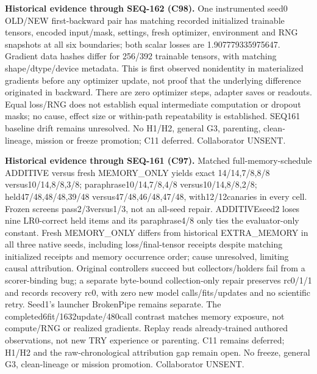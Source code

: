 \documentclass{article}
\begin{document}
\noindent\textbf{Historical evidence through SEQ-162 (C98).}
One instrumented seed0 OLD/NEW first-backward pair has matching recorded
initialized trainable tensors, encoded input/mask, settings, fresh optimizer,
environment and RNG snapshots at all six boundaries; both scalar losses are
1.907779335975647. Gradient data hashes differ for 256/392 trainable tensors,
with matching shape/dtype/device metadata. This is first observed nonidentity
in materialized gradients before any optimizer update, not proof that the
underlying difference originated in backward. There are zero optimizer steps,
adapter saves or readouts. Equal loss/RNG does not establish equal intermediate
computation or dropout masks; no cause, effect size or within-path repeatability
is established. SEQ161 baseline drift remains unresolved. No H1/H2, general G3,
parenting, clean-lineage, mission or freeze promotion; C11 deferred. Collaborator UNSENT.

\noindent\textbf{Historical evidence through SEQ-161 (C97).}
Matched full-memory-schedule ADDITIVE versus fresh MEMORY\_ONLY yields exact
14/14,7/8,8/8 versus10/14,8/8,3/8; paraphrase10/14,7/8,4/8 versus10/14,8/8,2/8;
held47/48,48/48,39/48 versus47/48,46/48,47/48, with12/12canaries in every cell.
Frozen screens pass2/3versus1/3, not an all-seed repair. ADDITIVEseed2 loses nine
LR0-correct held items and its paraphrase4/8 only ties the evaluator-only constant.
Fresh MEMORY\_ONLY differs from historical EXTRA\_MEMORY in all three native seeds,
including loss/final-tensor receipts despite matching initialized receipts and
memory occurrence order; cause unresolved, limiting causal attribution.
Original controllers succeed but collectors/holders fail from a scorer-binding
bug; a separate byte-bound collection-only repair preserves rc0/1/1 and records
recovery rc0, with zero new model calls/fits/updates and no scientific retry.
Seed1's launcher BrokenPipe remains separate. The completed6fit/1632update/480call
contrast matches memory exposure, not compute/RNG or realized gradients. Replay
reads already-trained authored observations, not new TRY experience or parenting.
C11 remains deferred; H1/H2 and the raw-chronological attribution gap remain open.
No freeze, general G3, clean-lineage or mission promotion. Collaborator UNSENT.
\end{document}
